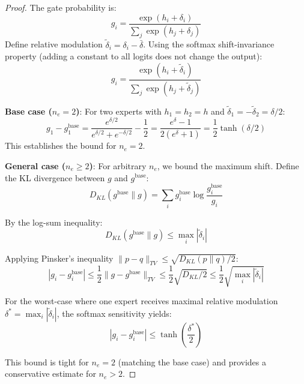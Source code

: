 \documentclass[preprint,12pt]{elsarticle}
\begin{document}
\begin{proof}
The gate probability is:
\begin{equation}
g_i = \frac{\exp(h_i + \delta_i)}{\sum_j \exp(h_j + \delta_j)}
\end{equation}
Define relative modulation $\tilde{\delta}_i = \delta_i - \bar{\delta}$. Using the softmax shift-invariance property (adding a constant to all logits does not change the output):
\begin{equation}
g_i = \frac{\exp(h_i + \tilde{\delta}_i)}{\sum_j \exp(h_j + \tilde{\delta}_j)}
\end{equation}

\textbf{Base case ($n_e = 2$)}: For two experts with $h_1 = h_2 = h$ and $\tilde{\delta}_1 = -\tilde{\delta}_2 = \delta/2$:
\begin{equation}
g_1 - g_1^{\text{base}} = \frac{e^{\delta/2}}{e^{\delta/2} + e^{-\delta/2}} - \frac{1}{2} = \frac{e^\delta - 1}{2(e^\delta + 1)} = \frac{1}{2}\tanh(\delta/2)
\end{equation}
This establishes the bound for $n_e = 2$.

\textbf{General case ($n_e \geq 2$)}: For arbitrary $n_e$, we bound the maximum shift. Define the KL divergence between $g$ and $g^{\text{base}}$:
\begin{equation}
D_{KL}(g^{\text{base}} \| g) = \sum_i g_i^{\text{base}} \log\frac{g_i^{\text{base}}}{g_i}
\end{equation}

By the log-sum inequality:
\begin{equation}
D_{KL}(g^{\text{base}} \| g) \leq \max_i |\tilde{\delta}_i|
\end{equation}

Applying Pinsker's inequality $\|p - q\|_{TV} \leq \sqrt{D_{KL}(p\|q)/2}$:
\begin{equation}
|g_i - g_i^{\text{base}}| \leq \frac{1}{2}\|g - g^{\text{base}}\|_{TV} \leq \frac{1}{2}\sqrt{D_{KL}/2} \leq \frac{1}{2}\sqrt{\max_i |\tilde{\delta}_i|}
\end{equation}

For the worst-case where one expert receives maximal relative modulation $\delta^* = \max_i |\tilde{\delta}_i|$, the softmax sensitivity yields:
\begin{equation}
|g_i - g_i^{\text{base}}| \leq \tanh\left(\frac{\delta^*}{2}\right)
\end{equation}

This bound is tight for $n_e = 2$ (matching the base case) and provides a conservative estimate for $n_e > 2$.
\end{proof}
\end{document}
